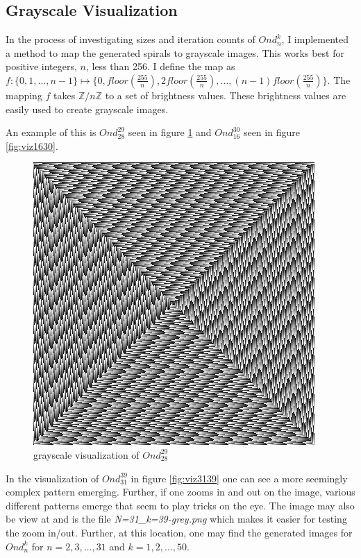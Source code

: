 \documentclass[11pt]{amsart}
\theoremstyle{mydef}
\begin{document}
\subsection{Grayscale Visualization}

In the process of investigating sizes and iteration counts of $Ond^k_n$, I implemented a method to map the generated spirals to grayscale images. This works best for positive integers, $n$, less than 256. I define the map as $f : \{ 0, 1, \ldots, n-1 \} \mapsto \{ 0, floor(\frac{255}{n}), 2floor(\frac{255}{n}), \ldots, (n-1)floor(\frac{255}{n}) \}$. The mapping $f$ takes $\mathbb{Z}/n\mathbb{Z}$ to a set of brightness values. These brightness values are easily used to create grayscale images.



An example of this is $Ond^{29}_{28}$ seen in figure \ref{fig:viz2928} and $Ond^{30}_{16}$ seen in figure \ref{fig:viz1630}.

\begin{figure}[h]
\centering
\includegraphics[scale=0.7]{N28k29b.png}
\caption{grayscale visualization of $Ond^{29}_{28}$}
\label{fig:viz2928}
\end{figure}

In the visualization of $Ond^{39}_{31}$ in figure \ref{fig:viz3139} one can see a more seemingly complex pattern emerging. Further, if one zooms in and out on the image, various different patterns emerge that seem to play tricks on the eye. The image may also be view at \cite{GraySquare} and is the file \textit{N=31\_k=39-grey.png} which makes it easier for testing the zoom in/out. Further, at this location, one may find the generated images for $Ond^k_n$ for $n=2, 3, \ldots, 31$ and $k=1,2, \ldots, 50$.
\end{document}
